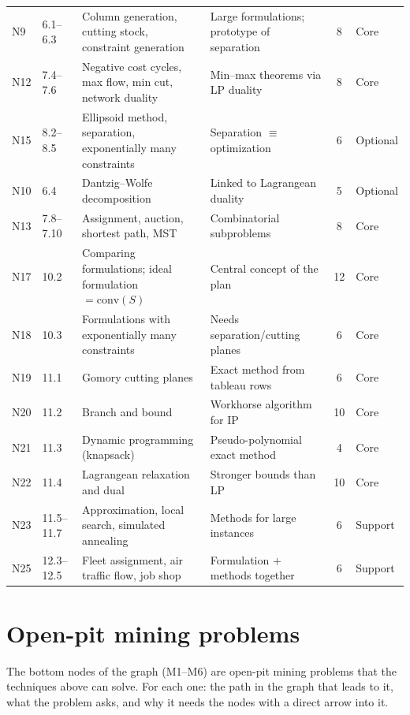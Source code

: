 \documentclass[11pt,a4paper]{article}
\begin{document}
\begin{longtable}{@{}l L{1.5cm} L{4.9cm} L{4.9cm} c l@{}}
N9 & 6.1--6.3 & Column generation, cutting stock, constraint generation & Large formulations; prototype of separation & 8 & Core\\
N12 & 7.4--7.6 & Negative cost cycles, max flow, min cut, network duality & Min--max theorems via LP duality & 8 & Core\\
N15 & 8.2--8.5 & Ellipsoid method, separation, exponentially many constraints & Separation $\equiv$ optimization & 6 & Optional\\
N10 & 6.4 & Dantzig--Wolfe decomposition & Linked to Lagrangean duality & 5 & Optional\\
N13 & 7.8--7.10 & Assignment, auction, shortest path, MST & Combinatorial subproblems & 8 & Core\\
N17 & 10.2 & Comparing formulations; ideal formulation $=\mathrm{conv}(S)$ & Central concept of the plan & 12 & Core\\
N18 & 10.3 & Formulations with exponentially many constraints & Needs separation/cutting planes & 6 & Core\\
N19 & 11.1 & Gomory cutting planes & Exact method from tableau rows & 6 & Core\\
N20 & 11.2 & Branch and bound & Workhorse algorithm for IP & 10 & Core\\
N21 & 11.3 & Dynamic programming (knapsack) & Pseudo-polynomial exact method & 4 & Core\\
N22 & 11.4 & Lagrangean relaxation and dual & Stronger bounds than LP & 10 & Core\\
N23 & 11.5--11.7 & Approximation, local search, simulated annealing & Methods for large instances & 6 & Support\\
N25 & 12.3--12.5 & Fleet assignment, air traffic flow, job shop & Formulation $+$ methods together & 6 & Support\\
\end{longtable}
\normalsize

\section{Open-pit mining problems}
The bottom nodes of the graph (M1--M6) are open-pit mining problems that the techniques above can solve. For each one: the path in the graph that leads to it, what the problem asks, and why it needs the nodes with a direct arrow into it.
\end{document}
